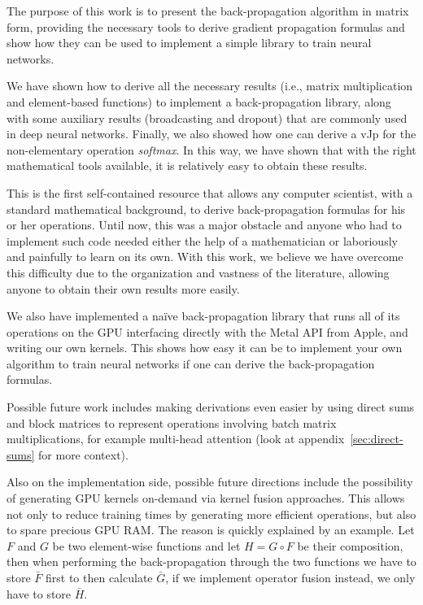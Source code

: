 \documentclass{sapthesis}
\begin{document}
The purpose of this work is to present the back-propagation algorithm in matrix
form, providing the necessary tools to derive gradient propagation formulas and
show how they can be used to implement a simple library to train neural
networks.

We have shown how to derive all the necessary results (i.e., matrix
multiplication and element-based functions) to implement a back-propagation
library, along with some auxiliary results (broadcasting and dropout) that are
commonly used in deep neural networks.  Finally, we also showed how one can
derive a vJp for the non-elementary operation \emph{softmax}. In this way, we
have shown that with the right mathematical tools available, it is relatively
easy to obtain these results.

This is the first self-contained resource that allows any computer scientist,
with a standard mathematical background, to derive back-propagation formulas for
his or her operations. Until now, this was a major obstacle and anyone who had
to implement such code needed either the help of a mathematician or laboriously
and painfully to learn on its own.  With this work, we believe we have overcome
this difficulty due to the organization and vastness of the literature, allowing
anyone to obtain their own results more easily.

We also have implemented a na\"ive back-propagation library that runs all of its
operations on the GPU interfacing directly with the Metal API from Apple, and
writing our own kernels. This shows how easy it can be to implement your own
algorithm to train neural networks if one can derive the back-propagation
formulas.

Possible future work includes making derivations even easier by using direct
sums and block matrices to represent operations involving batch matrix
multiplications, for example multi-head attention (look at
appendix~\ref{sec:direct-sums} for more context).

Also on the implementation side, possible future directions include the
possibility of generating GPU kernels on-demand via kernel fusion approaches. This
allows not only to reduce training times by generating more efficient
operations, but also to spare precious GPU RAM. The reason is quickly explained
by an example. Let \(F\) and \(G\) be two element-wise functions and let \(H = G
\circ F\) be their composition, then when performing the back-propagation
through the two functions we have to store \(\bar F\) first to then calculate
\(\bar G\), if we implement operator fusion instead, we only have to store
\(\bar H.\)
\end{document}
